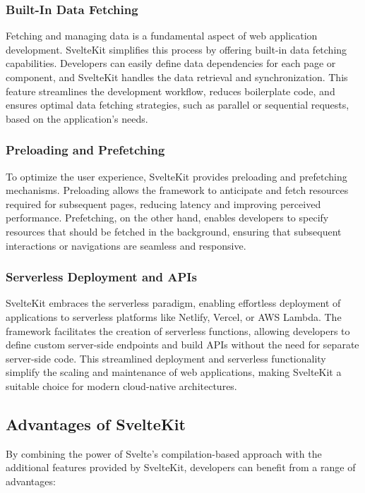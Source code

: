 \subsubsection{Built-In Data Fetching}

Fetching and managing data is a fundamental aspect of web application development. SvelteKit simplifies this process by offering built-in data fetching capabilities. Developers can easily define data dependencies for each page or component, and SvelteKit handles the data retrieval and synchronization. This feature streamlines the development workflow, reduces boilerplate code, and ensures optimal data fetching strategies, such as parallel or sequential requests, based on the application's needs.

\subsubsection{Preloading and Prefetching}

To optimize the user experience, SvelteKit provides preloading and prefetching mechanisms. Preloading allows the framework to anticipate and fetch resources required for subsequent pages, reducing latency and improving perceived performance. Prefetching, on the other hand, enables developers to specify resources that should be fetched in the background, ensuring that subsequent interactions or navigations are seamless and responsive.

\subsubsection{Serverless Deployment and APIs}

SvelteKit embraces the serverless paradigm, enabling effortless deployment of applications to serverless platforms like Netlify, Vercel, or AWS Lambda. The framework facilitates the creation of serverless functions, allowing developers to define custom server-side endpoints and build APIs without the need for separate server-side code. This streamlined deployment and serverless functionality simplify the scaling and maintenance of web applications, making SvelteKit a suitable choice for modern cloud-native architectures.

\subsection{Advantages of SvelteKit}

By combining the power of Svelte's compilation-based approach with the additional features provided by SvelteKit, developers can benefit from a range of advantages:

